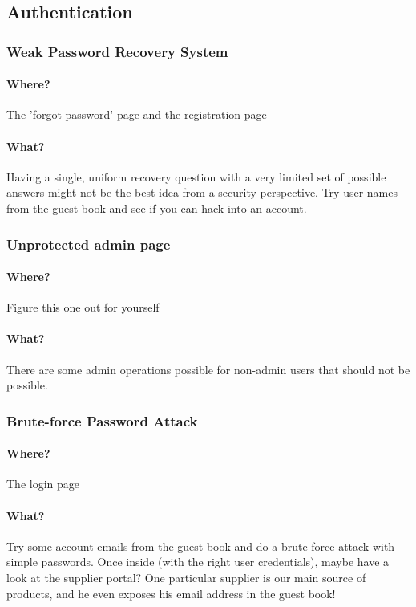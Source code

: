 \documentclass[12pt,a4paper]{article}
\begin{document}
\subsection{Authentication}
\subsubsection{Weak Password Recovery System}
\paragraph{Where?}
The 'forgot password' page and the registration page

\paragraph{What?}
Having a single, uniform recovery question with a very limited set of possible answers might not be the best idea from a security perspective. Try user names from the guest book and see if you can hack into an account.

\subsubsection{Unprotected admin page}
\paragraph{Where?}
Figure this one out for yourself

\paragraph{What?}
There are some admin operations possible for non-admin users that should not be possible.

\subsubsection{Brute-force Password Attack}
\paragraph{Where?}
The login page

\paragraph{What?}
Try some account emails from the guest book and do a brute force attack with simple passwords. Once inside (with the right user credentials), maybe have a look at the supplier portal? One particular supplier is our main source of products, and he even exposes his email address in the guest book!
\end{document}
